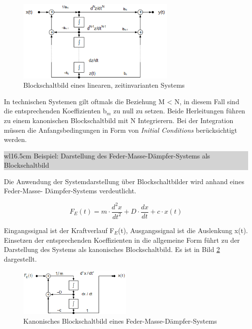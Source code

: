 \begin{figure}[H]
  \centerline{\includegraphics[width=0.7\textwidth]{Kapitel2/Bilder/image31}}
  \caption{Blockschaltbild eines linearen, zeitinvarianten Systems}
  \label{fig:BlockschaltbildZeitinvariant}
\end{figure}

\noindent In technischen Systemen gilt oftmals die Beziehung M < N, in diesem Fall sind die entsprechenden Koeffizienten b$_{m}$ zu null zu setzen.
Beide Herleitungen führen zu einem kanonischen Blockschaltbild mit N Integrierern. Bei der Integration müssen die Anfangsbedingungen in Form von \textit{Initial Conditions} berücksichtigt werden.

\bigskip

\noindent
\colorbox{lightgray}{%
%
\renewcommand\arraystretch{0.6}%
\begin{tabular}{ wl{16.5cm} }
{\selectfont
\noindent
Beispiel: Darstellung des Feder-Masse-Dämpfer-Systems als Blockschaltbild}
\end{tabular}%
}\bigskip

\noindent Die Anwendung der Systemdarstellung über Blockschaltbilder wird anhand eines Feder-Masse-
Dämpfer-Systems verdeutlicht.

\begin{equation}\label{eq:threetwohundredeight}
F_{E} \left(t\right)=m\cdot \frac{d^{2} x}{dt^{2} } +D\cdot \frac{dx}{dt} +c\cdot x\left(t\right)
\end{equation}

\noindent Eingangssignal ist der Kraftverlauf F$_{E}$(t), Ausgangssignal ist die Auslenkung x(t). Einsetzen der
entsprechenden Koeffizienten in die allgemeine Form führt zu der Darstellung des Systems als kanonisches Blockschaltbild. Es ist in Bild \ref{fig:BlockschaltbilFDM} dargestellt.

\begin{figure}[H]
  \centerline{\includegraphics[width=0.5\textwidth]{Kapitel2/Bilder/image32}}
  \caption{Kanonisches Blockschaltbild eines Feder-Masse-Dämpfer-Systems}
  \label{fig:BlockschaltbilFDM}
\end{figure}

